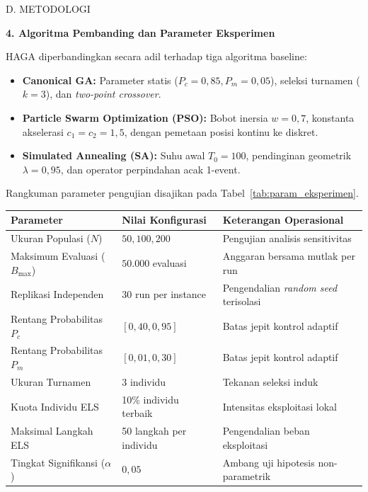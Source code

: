 \documentclass[letterpaper,12pt,oneside]{article}
\newcommand{\subheading}[2]{%
  \par\vspace{0.8em}\noindent
  \textbf{#1. #2}\par\vspace{0.3em}
}
\begin{document}
\begin{wordsection}{D. METODOLOGI}
\subheading{4}{Algoritma Pembanding dan Parameter Eksperimen}

HAGA diperbandingkan secara adil terhadap tiga algoritma baseline:
\begin{itemize}\setlength{\itemsep}{0pt}\setlength{\parsep}{0pt}\setlength{\parskip}{0pt}
    \item \textbf{Canonical GA:} Parameter statis ($P_c = 0{,}85, P_m = 0{,}05$), seleksi turnamen ($k=3$), dan \textit{two-point crossover}.
    \item \textbf{Particle Swarm Optimization (PSO):} Bobot inersia $w=0{,}7$, konstanta akselerasi $c_1=c_2=1{,}5$, dengan pemetaan posisi kontinu ke diskret.
    \item \textbf{Simulated Annealing (SA):} Suhu awal $T_0=100$, pendinginan geometrik $\lambda=0{,}95$, dan operator perpindahan acak 1-event.
\end{itemize}

Rangkuman parameter pengujian disajikan pada Tabel~\ref{tab:param_eksperimen}.

\begin{center}
\label{tab:param_eksperimen}
\small
\begin{tabularx}{\linewidth}{l l >{\RaggedRight\arraybackslash}X}
\toprule
\textbf{Parameter} & \textbf{Nilai Konfigurasi} & \textbf{Keterangan Operasional} \\
\midrule
Ukuran Populasi ($N$) & $50, 100, 200$ & Pengujian analisis sensitivitas \\
Maksimum Evaluasi ($B_{\max}$) & $50.000$ evaluasi & Anggaran bersama mutlak per run \\
Replikasi Independen & 30 run per instance & Pengendalian \textit{random seed} terisolasi \\
Rentang Probabilitas $P_c$ & $[0{,}40, 0{,}95]$ & Batas jepit kontrol adaptif \\
Rentang Probabilitas $P_m$ & $[0{,}01, 0{,}30]$ & Batas jepit kontrol adaptif \\
Ukuran Turnamen & 3 individu & Tekanan seleksi induk \\
Kuota Individu ELS & 10\% individu terbaik & Intensitas eksploitasi lokal \\
Maksimal Langkah ELS & 50 langkah per individu & Pengendalian beban eksploitasi \\
Tingkat Signifikansi ($\alpha$) & $0{,}05$ & Ambang uji hipotesis non-parametrik \\
\bottomrule
\end{tabularx}
\end{center}


\end{wordsection}
\end{document}
